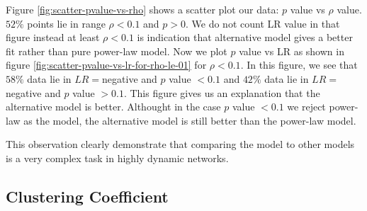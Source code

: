 \documentclass[10pt,conference,letterpaper]{IEEEtran}
\begin{document}
Figure \ref{fig:scatter-pvalue-vs-rho} shows a scatter plot our data: $p$ value vs $\rho$ value.
$52\%$ points lie in range $\rho < 0.1$ and $p > 0$.
We do not count LR value in that figure instead at least $\rho < 0.1$ is indication that alternative model gives a better fit rather than pure power-law model.
Now we plot $p$ value vs LR as shown in figure \ref{fig:scatter-pvalue-vs-lr-for-rho-le-01} for $\rho < 0.1$. 
In this figure, we see that $58\%$ data lie in $LR=$negative and $p$ value $< 0.1$ and $42\%$ data lie in $LR=$negative and $p$ value $>0.1$.
This figure gives us an explanation that the alternative model is better. 
Althought in the case $p$ value $<0.1$ we reject power-law as the model, the alternative model is still better than the power-law model. 

This observation clearly demonstrate that comparing the model to other models is a very complex task in highly dynamic networks.

\subsection{Clustering Coefficient}\label{clusteringcoef}
\end{document}
